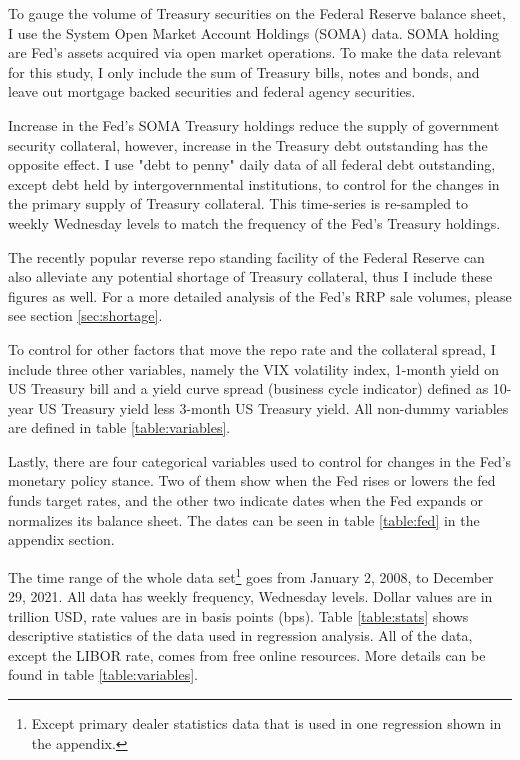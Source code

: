 \documentclass[11pt,a4paper,english,oneside]{article}
\begin{document}
To gauge the volume of Treasury securities on the Federal Reserve balance sheet, I use the System Open Market Account Holdings (SOMA) data. SOMA holding are Fed's assets acquired via open market operations. To make the data relevant for this study, I only include the sum of Treasury bills, notes and bonds, and leave out mortgage backed securities and federal agency securities.

Increase in the Fed's SOMA Treasury holdings reduce the supply of government security collateral, however, increase in the Treasury debt outstanding has the opposite effect. I use "debt to penny" daily data of all federal debt outstanding, except debt held by intergovernmental institutions, to control for the changes in the primary supply of Treasury collateral. This time-series is re-sampled to weekly Wednesday levels to match the frequency of the Fed's Treasury holdings.

The recently popular reverse repo standing facility of the Federal Reserve can also alleviate any potential shortage of Treasury collateral, thus I include these figures as well. For a more detailed analysis of the Fed's RRP sale volumes, please see section \ref{sec:shortage}.

To control for other factors that move the repo rate and the collateral spread, I include three other variables, namely the VIX volatility index, 1-month yield on US Treasury bill and a yield curve spread (business cycle indicator) defined as 10-year US Treasury yield less 3-month US Treasury yield. All non-dummy variables are defined in table \ref{table:variables}.

Lastly, there are four categorical variables used to control for changes in the Fed's monetary policy stance. Two of them show when the Fed rises or lowers the fed funds target rates, and the other two indicate dates when the Fed expands or normalizes its balance sheet. The dates can be seen in table \ref{table:fed} in the appendix section.

The time range of the whole data set\footnote{Except primary dealer statistics data that is used in one regression shown in the appendix.} goes from January 2, 2008, to December 29, 2021. All data has weekly frequency, Wednesday levels. Dollar values are in trillion USD, rate values are in basis points (bps). Table \ref{table:stats} shows descriptive statistics of the data used in regression analysis. All of the data, except the LIBOR rate, comes from free online resources. More details can be found in table \ref{table:variables}.
\end{document}
